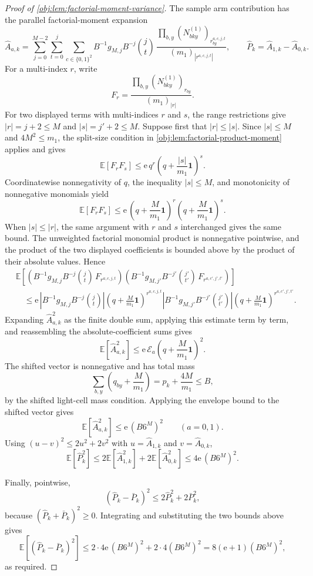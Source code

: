 \begin{proof}[Proof of \cref{obj:lem:factorial-moment-variance}]
The sample arm contribution has the parallel factorial-moment expansion
\[
\widehat A_{a,k}
=
\sum_{j=0}^{M-2}\sum_{t=0}^{j}\sum_{c\in\{0,1\}^2}
B^{-1}g_{M,j}B^{-j}\binom jt\,
\frac{\prod_{b,y}(N^{(1)}_{bky})_{r^{a,c,j,t}_{by}}}{(m_1)_{|r^{a,c,j,t}|}},
\qquad
\widehat P_k=\widehat A_{1,k}-\widehat A_{0,k}.
\]
For a multi-index \(r\), write
\[
F_r=\frac{\prod_{b,y}(N^{(1)}_{bky})_{r_{by}}}{(m_1)_{|r|}}.
\]
For two displayed terms with multi-indices \(r\) and \(s\), the range restrictions give \(|r|=j+2\le M\) and \(|s|=j'+2\le M\). Suppose first that \(|r|\le |s|\). Since \(|s|\le M\) and \(4M^2\le m_1\), the split-size condition in \cref{obj:lem:factorial-product-moment} applies and gives
\[
\mathbb E[F_rF_s]
\le
\mathrm e\,q^r
\left(q+\frac{|s|}{m_1}\mathbf 1\right)^s .
\]
Coordinatewise nonnegativity of \(q\), the inequality \(|s|\le M\), and monotonicity of nonnegative monomials yield
\[
\mathbb E[F_rF_s]
\le
\mathrm e\,
\left(q+\frac{M}{m_1}\mathbf 1\right)^r
\left(q+\frac{M}{m_1}\mathbf 1\right)^s .
\]
When \(|s|\le |r|\), the same argument with \(r\) and \(s\) interchanged gives the same bound. The unweighted factorial monomial product is nonnegative pointwise, and the product of the two displayed coefficients is bounded above by the product of their absolute values. Hence
\[
\begin{aligned}
&\mathbb E\!\left[
\left(B^{-1}g_{M,j}B^{-j}\binom jt\,
F_{r^{a,c,j,t}}\right)
\left(B^{-1}g_{M,j'}B^{-j'}\binom {j'}{t'}\,
F_{r^{a,c',j',t'}}\right)
\right]
\\
&\quad\le
\mathrm e\,
\left|B^{-1}g_{M,j}B^{-j}\binom jt\right|
\left(q+\frac{M}{m_1}\mathbf 1\right)^{r^{a,c,j,t}}
\left|B^{-1}g_{M,j'}B^{-j'}\binom {j'}{t'}\right|
\left(q+\frac{M}{m_1}\mathbf 1\right)^{r^{a,c',j',t'}} .
\end{aligned}
\]
Expanding \(\widehat A_{a,k}^2\) as the finite double sum, applying this estimate term by term, and reassembling the absolute-coefficient sums gives
\[
\mathbb E[\widehat A_{a,k}^2]
\le
\mathrm e\,\mathcal E_a\!\left(q+\frac{M}{m_1}\mathbf 1\right)^2.
\]
The shifted vector is nonnegative and has total mass
\[
\sum_{b,y}\left(q_{by}+\frac{M}{m_1}\right)
=p_k+\frac{4M}{m_1}
\le B,
\]
by the shifted light-cell mass condition. Applying the envelope bound to the shifted vector gives
\[
\mathbb E[\widehat A_{a,k}^2]
\le \mathrm e\,(B6^M)^2
\qquad
(a=0,1).
\]
Using \((u-v)^2\le2u^2+2v^2\) with \(u=\widehat A_{1,k}\) and \(v=\widehat A_{0,k}\),
\[
\mathbb E[\widehat P_k^2]
\le 2\mathbb E[\widehat A_{1,k}^2]+2\mathbb E[\widehat A_{0,k}^2]
\le4\mathrm e\,(B6^M)^2.
\]

Finally, pointwise,
\[
(\widehat P_k-\bar P_k)^2
\le 2\widehat P_k^2+2\bar P_k^2,
\]
because \((\widehat P_k+\bar P_k)^2\ge0\). Integrating and substituting the two bounds above gives
\[
\mathbb E\!\left[(\widehat P_k-\bar P_k)^2\right]
\le
2\cdot4\mathrm e\,(B6^M)^2+2\cdot4(B6^M)^2
=
8(\mathrm e+1)(B6^M)^2,
\]
as required.
\end{proof}
